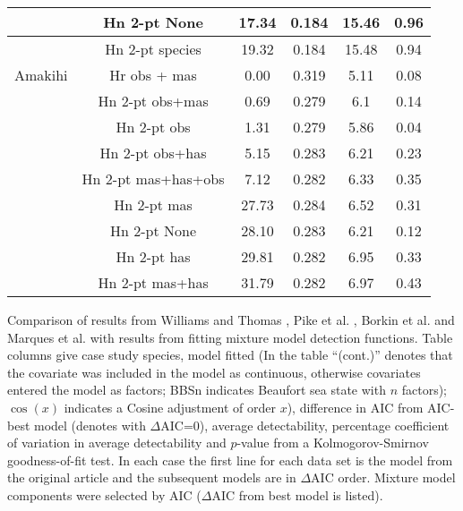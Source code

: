 \documentclass[10pt]{article}
\begin{document}
\begin{table}[!ht]
\begin{tabular}{| c | c | c | c | c | c |}
 \hline
 & Hn 2-pt  None                                                     &  17.34 &  0.184  &  15.46  &  0.96 \\
 \hline
 & Hn 2-pt species                                          &  19.32  &  0.184  &  15.48  &  0.94 \\
\hline
Amakihi  & Hr obs + mas & 0.00 &  0.319 & 5.11 & 0.08\\ %
\hline
 & Hn 2-pt obs+mas               &  0.69   &  0.279  &  6.1  &  0.14 \\
\hline
 & Hn 2-pt obs                            &  1.31   &  0.279  &  5.86  &  0.04 \\
 \hline
 & Hn 2-pt obs+has               &  5.15   &  0.283  &  6.21  &  0.23 \\
\hline
 & Hn 2-pt mas+has+obs  &  7.12  &  0.282  &  6.33  &  0.35 \\
 \hline
 & Hn 2-pt mas                            &  27.73  &  0.284  &  6.52  &  0.31 \\
 \hline
 & Hn 2-pt None                                    &  28.10   &  0.283  &  6.21  &  0.12 \\
\hline
 & Hn 2-pt has                            &  29.81  &  0.282  &  6.95  &  0.33 \\
\hline
 & Hn 2-pt mas+has               &  31.79  &  0.282  &  6.97  &  0.43 \\
\hline
\end{tabular}
\begin{flushleft}Comparison of results from Williams and Thomas \cite{Williams:2007tc}, Pike et al. \cite{Pike:2003ug}, Borkin et al. \cite{Borkin:2012vj} and Marques et al. \cite{Marques:2007vm} with results from fitting mixture model detection functions. Table columns give case study species, model fitted (In the table ``(cont.)'' denotes that the covariate was included in the model as continuous, otherwise covariates entered the model as factors; BBSn indicates Beaufort sea state with $n$ factors); $\cos(x)$ indicates a Cosine adjustment of order $x$), difference in AIC from AIC-best model (denotes with $\Delta$AIC=0), average detectability, percentage coefficient of variation in average detectability and $p$-value from a Kolmogorov-Smirnov goodness-of-fit test. In each case the first line for each data set is the model from the original article and the subsequent models are in $\Delta$AIC order. Mixture model components were selected by AIC ($\Delta$AIC from best model is listed). 
\end{flushleft}
\label{williams-pike-table}
\end{table}
\end{document}
